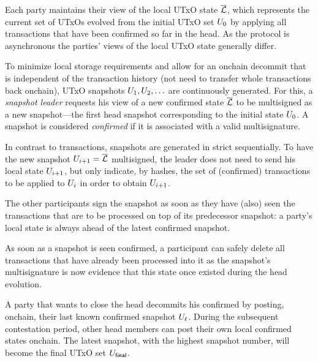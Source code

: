 Each party maintains their view of the local UTxO state $\overline {\mathcal L}$, which
represents the current set of UTxOs evolved from the initial UTxO set $U_{0}$
by applying all transactions that  have been confirmed so far in the head. As the
protocol is asynchronous the parties' views of the local UTxO state generally
differ.

 To minimize local storage requirements and allow for an
onchain decommit that is independent of the transaction history (not need to
transfer whole transactions back onchain), UTxO snapshots $U_1,U_2,\ldots$ are
continuously generated. For this, a \emph{snapshot leader} requests his view of
a new confirmed state $\overline {\mathcal L}$ to be multisigned as a new snapshot---the first
head snapshot corresponding to the initial state $U_{0}$. A snapshot is
considered \emph{confirmed} if it is associated with a valid multisignature.

In contrast to transactions, snapshots are generated in strict sequentially. To
have the new snapshot $U_{i+1}=\overline {\mathcal L}$ multisigned, the leader does not need
to send his local state $U_{i+1}$, but only indicate, by hashes, the set of
(confirmed) transactions to be applied to $U_i$ in order to obtain
$U_{i+1}$.

The other participants sign the snapshot as soon as they have (also) seen the
transactions that are to be processed on top of its predecessor snapshot: a
party's local state is always ahead of the latest confirmed snapshot.

As soon as a snapshot is seen confirmed, a participant can safely
delete all transactions that have already been processed into it as the
snapshot's multisignature is now evidence that this state once existed
during the head evolution.

 A party that wants to close the head decommits
his confirmed by posting, onchain, their last known confirmed snapshot
$U_\ell$. During the subsequent contestation period, other head members can
post their own local confirmed states onchain. The latest snapshot, with the
highest snapshot number, will become the final UTxO set $U_{\mathsf{final}}$.

